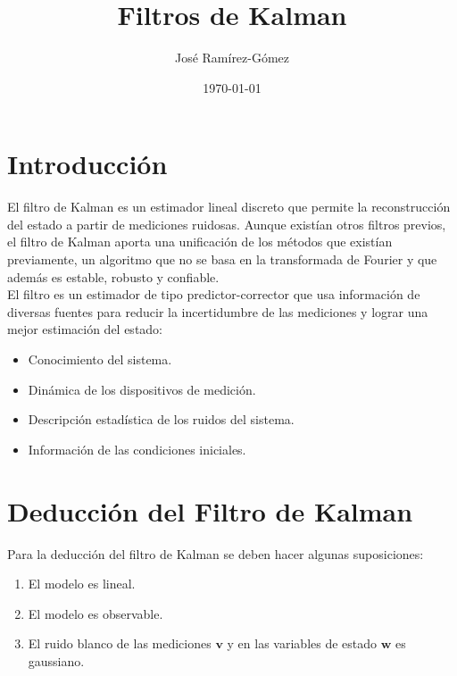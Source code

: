 \documentclass[10pt]{article}
\title{Filtros de Kalman}
\author{José Ramírez-Gómez}
\date{\today}
\begin{document}
	\maketitle
	\tableofcontents 
	\newpage
	

\section{Introducción}
	\noindent El filtro de Kalman es un estimador lineal discreto que permite la reconstrucción del estado a partir de mediciones ruidosas. Aunque existían otros filtros previos, el filtro de Kalman aporta una unificación de los métodos que existían previamente, un algoritmo que no se basa en la transformada de Fourier y que además es estable, robusto y confiable.\\
	
	\noindent El filtro es un estimador de tipo predictor-corrector que usa información de diversas fuentes para reducir la incertidumbre de las mediciones y lograr una mejor estimación del estado:
		
		\begin{itemize}
			\item Conocimiento del sistema.
			\item Dinámica de los dispositivos de medición.
			\item Descripción estadística de los ruidos del sistema.
			\item Información de las condiciones iniciales.
		\end{itemize}

\section{Deducción del Filtro de Kalman}
	\noindent Para la deducción del filtro de Kalman se deben hacer algunas suposiciones:
		
		\begin{enumerate}
			\item El modelo es lineal.
			\item El modelo es observable.
			\item El ruido blanco de las mediciones $\mathbf{v}$ y en las variables de estado $\mathbf{w}$ es gaussiano.
		\end{enumerate}
	
\end{document}
